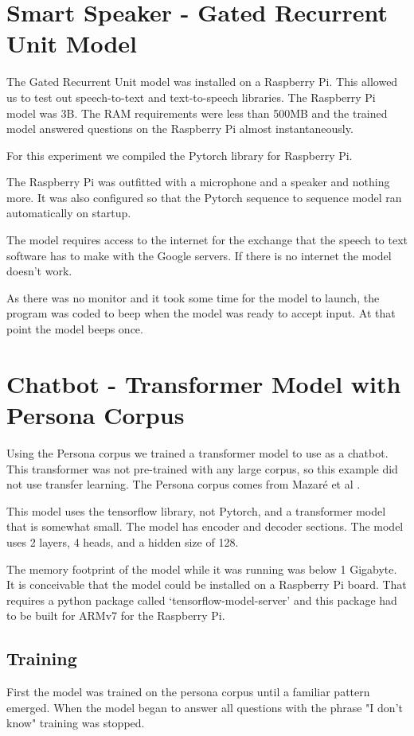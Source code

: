 \section{Smart Speaker - Gated Recurrent Unit Model}

The Gated Recurrent Unit model was installed on a Raspberry Pi. This allowed us to test out speech-to-text and text-to-speech libraries. The Raspberry Pi model was 3B. The RAM requirements were less than 500MB and the trained model answered questions on the Raspberry Pi almost instantaneously.

For this experiment we compiled the Pytorch library for Raspberry Pi.

The Raspberry Pi was outfitted with a microphone and a speaker and nothing more. It was also configured so that the Pytorch sequence to sequence model ran automatically on startup.

The model requires access to the internet for the exchange that the speech to text software has to make with the Google servers. If there is no internet the model doesn't work.

As there was no monitor and it took some time for the model to launch, the program was coded to beep when the model was ready to accept input. At that point the model beeps once.

\section{Chatbot - Transformer Model with Persona Corpus}
Using the Persona corpus we trained a transformer model to use as a chatbot. This transformer was not pre-trained with any large corpus, so this example did not use transfer learning. The Persona corpus comes from Mazar{\'{e}} et al \cite{DBLP:journals/corr/abs-1809-01984}.

This model uses the tensorflow library, not Pytorch, and a transformer model that is somewhat small. The model has encoder and decoder sections. The model uses 2 layers, 4 heads, and a hidden size of 128.

The memory footprint of the model while it was running was below 1 Gigabyte. It is conceivable that the model could be installed on a Raspberry Pi board. That requires a python package called `tensorflow-model-server' and this package had to be built for ARMv7 for the Raspberry Pi. 

\subsection{Training}
First the model was trained on the persona corpus until a familiar pattern emerged. When the model began to answer all questions with the phrase "I don't know" training was stopped. 

